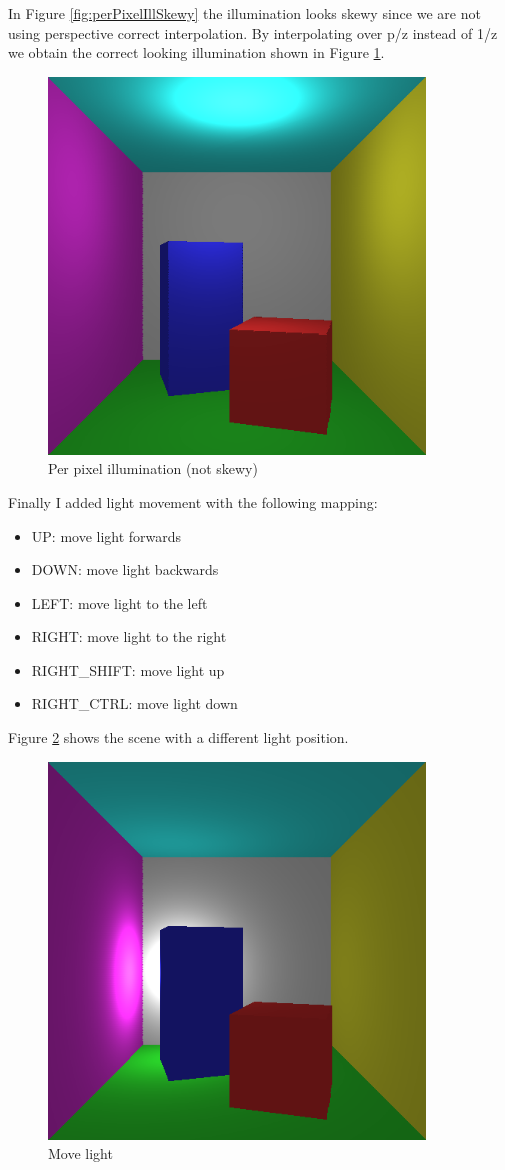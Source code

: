 In Figure \ref{fig:perPixelIllSkewy} the illumination looks skewy since we are not using perspective correct
interpolation. By interpolating over p/z instead of 1/z we obtain the correct looking illumination 
shown in Figure \ref{fig:perPixelIllNotSkewy}.
\begin{figure}[ht]
    \centering
    \includegraphics[width=10cm]{screenshots/per_pixel_notskewy.png}
    \caption{Per pixel illumination (not skewy)}
    \label{fig:perPixelIllNotSkewy}
\end{figure}
Finally I added light movement with the following mapping: 
\begin{itemize}
    \item UP: move light forwards
    \item DOWN: move light backwards
    \item LEFT: move light to the left
    \item RIGHT: move light to the right
    \item RIGHT\_SHIFT: move light up
    \item RIGHT\_CTRL: move light down
\end{itemize}
Figure \ref{fig:moveLight} shows the scene with a different light position.
\begin{figure}[ht]
    \centering
    \includegraphics[width=10cm]{screenshots/move_light.png}
    \caption{Move light}
    \label{fig:moveLight}
\end{figure}